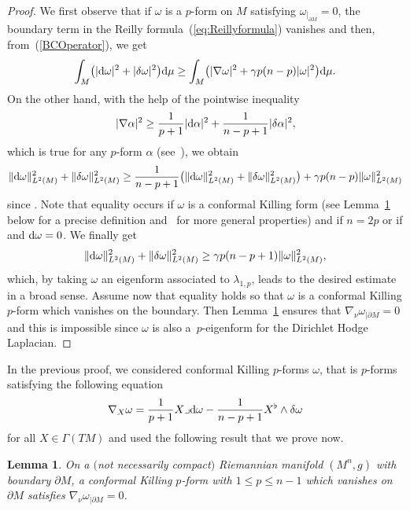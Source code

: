 \documentclass[10pt,a4paper]{amsart}
\numberwithin{equation}{section}
\newtheorem{Lemma}[Theorem]{Lemma}
\theoremstyle{definition}
\begin{document}
\begin{proof} We first observe that if $\omega$ is a $p$-form on $M$ satisfying $\omega_{|_{\partial M}}=0$, the boundary term in the Reilly formula~(\ref{eq:Reillyformula}) vanishes and then, from~(\ref{BCOperator}), we get
\[
\int_M\bigl(|{\rm d}\omega|^2+|\delta\omega|^2\bigr){\rm d}\mu\geq\int_M\bigl(|\nabla\omega|^2+\gamma p(n-p)|\omega|^2\bigr){\rm d}\mu.
\]
On the other hand, with the help of the pointwise inequality
\[
|\nabla\alpha|^2\geq\frac{1}{p+1}|{\rm d}\alpha|^2+\frac{1}{n-p+1}|\delta\alpha|^2,
\]
which is true for any $p$-form $\alpha$ (see~\cite[Lemme 6.8]{GM}), we obtain
\[
\|{\rm d}\omega \|^2_{L^2(M)}+\|\delta \omega \|^2_{L^2(M)}\ge \frac{1}{n-p+1}\bigl(\|{\rm d}\omega \|^2_{L^2(M)}+\|\delta \omega \|^2_{L^2(M)}\bigr)+\gamma p(n-p)\|\omega \|^2_{L^2(M)}
\]
since . Note that equality occurs if $\omega$ is a conformal Killing form (see Lemma~\ref{CKFB} below for a precise definition and~\cite{Semmelmann02} for more general properties) and if $n=2p$ or if  and ${\rm d}\omega=0$. We finally get
\begin{equation}\label{LaplaceBounds}
\|{\rm d}\omega\|^2_{L^2(M)}+\|\delta\omega \|^2_{L^2(M)} \geq \gamma p(n-p+1) \|\omega\|^2_{L^2(M)},
\end{equation}
which, by taking $\omega$ an eigenform associated to $\lambda_{1,p}$, leads to the desired estimate in a broad sense. Assume now that equality holds so that $\omega$ is a conformal Killing $p$-form which vanishes on the boundary. Then Lemma~\ref{CKFB} ensures that $\nabla_\nu\omega_{|\partial M}=0$ and this is impossible since $\omega$ is also a~$p$-eigenform for the Dirichlet Hodge Laplacian.
\end{proof}

In the previous proof, we considered conformal Killing $p$-forms $\omega$, that is $p$-forms satisfying the following equation
\begin{equation}\label{CKForms}
\nabla_X\omega=\frac{1}{p+1}X\lrcorner {\rm d}\omega-\frac{1}{n-p+1}X^\flat\wedge\delta\omega
\end{equation}
for all $X\in\Gamma(TM)$ and used the following result that we prove now.
\begin{Lemma}\label{CKFB}
On a $($not necessarily compact$)$ Riemannian manifold $(M^n,g)$ with boundary $\partial M$, a conformal Killing $p$-form with $1\leq p\leq n-1$ which vanishes on $\partial M$ satisfies $\nabla_\nu\omega_{|\partial M}=0$.
\end{Lemma}
\end{document}
